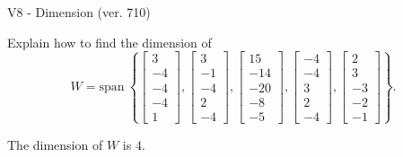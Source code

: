 \begin{exercise}
  \begin{exerciseTitle}V8 - Dimension (ver. 710)\end{exerciseTitle}
  \begin{exerciseStatement}
    Explain how to find the dimension of 
\[W=\mathrm{span}\ \left\{\left[\begin{array}{r}
3 \\
-4 \\
-4 \\
-4 \\
1
\end{array}\right] , \left[\begin{array}{r}
3 \\
-1 \\
-4 \\
2 \\
-4
\end{array}\right] , \left[\begin{array}{r}
15 \\
-14 \\
-20 \\
-8 \\
-5
\end{array}\right] , \left[\begin{array}{r}
-4 \\
-4 \\
3 \\
2 \\
-4
\end{array}\right] , \left[\begin{array}{r}
2 \\
3 \\
-3 \\
-2 \\
-1
\end{array}\right]\right\}.\]



  \end{exerciseStatement}
  \begin{exerciseAnswer}
   The dimension of \(W\) is  \(4\).
  


  \end{exerciseAnswer}
\end{exercise}